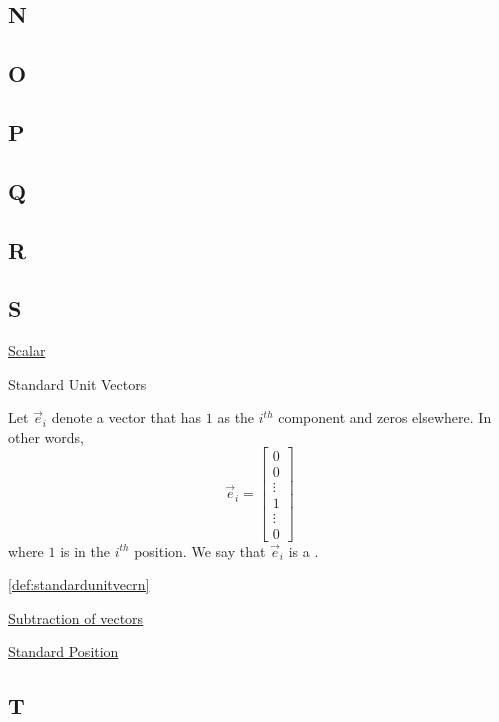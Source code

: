 \documentclass{ximera}
\begin{document}
\subsection{N}

\subsection{O}

\subsection{P}

\subsection{Q}

\subsection{R}

\subsection{S}
\href{https://ximera.osu.edu/oerlinalg/LinearAlgebra/VEC-0010/main}{Scalar} 

Standard Unit Vectors
\begin{expandable}
    \begin{definition}
  Let $\vec{e}_i$ denote a vector that has $1$ as the $i^{th}$ component and zeros elsewhere.  In other words, $$\vec{e}_i=\begin{bmatrix}
0\\
0\\
\vdots\\
1\\
\vdots\\
0
\end{bmatrix}$$ 
  where $1$ is in the $i^{th}$ position.  We say that  $\vec{e}_i$ is a .
\end{definition}
\ref{def:standardunitvecrn} 
\end{expandable}

\href{https://ximera.osu.edu/oerlinalg/LinearAlgebra/VEC-0030/main}{Subtraction of vectors}

\href{https://ximera.osu.edu/oerlinalg/LinearAlgebra/VEC-0010/main}{Standard Position}

\subsection{T}
\end{document}

